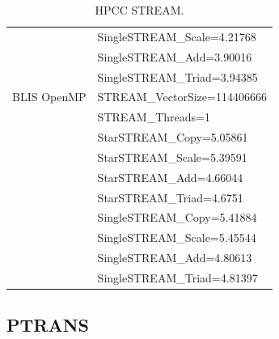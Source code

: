 \documentclass{report}
\begin{document}
\begin{table}[H]
\begin{center}
\begin{tabular}{ |l|l| }
                & SingleSTREAM\_Scale=4.21768 \\
                & SingleSTREAM\_Add=3.90016 \\
                & SingleSTREAM\_Triad=3.94385 \\
\hline
BLIS OpenMP     & STREAM\_VectorSize=114406666 \\
                & STREAM\_Threads=1 \\
                & StarSTREAM\_Copy=5.05861 \\
                & StarSTREAM\_Scale=5.39591 \\
                & StarSTREAM\_Add=4.66044 \\
                & StarSTREAM\_Triad=4.6751 \\
                & SingleSTREAM\_Copy=5.41884 \\
                & SingleSTREAM\_Scale=5.45544 \\
                & SingleSTREAM\_Add=4.80613 \\
                & SingleSTREAM\_Triad=4.81397 \\
\hline
\end{tabular}
\end{center}
\caption{\label{tab:table-name}HPCC STREAM.}
\end{table}


%
%
\subsection{PTRANS}
\end{document}
